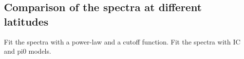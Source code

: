 \subsection{Comparison of the spectra at different latitudes}

Fit the spectra with a power-law and a cutoff function.
Fit the spectra with IC and pi0 models.

\begin{figure}
\vspace*{-0.2cm}
\end{figure}
